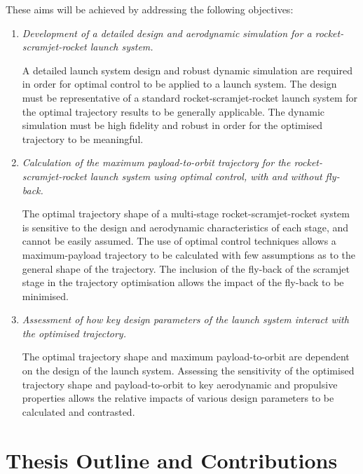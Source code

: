     
\vspace*{10pt}
    \noindent These aims will be achieved by addressing the following objectives:
    \begin{enumerate}
    	 \item \emph{Development of a detailed design and aerodynamic simulation for a rocket-scramjet-rocket launch system.}
    	 
    	   A detailed launch system design and robust dynamic simulation are required in order for optimal control to be applied to a launch system. The design must be representative of a standard rocket-scramjet-rocket launch system for the optimal trajectory results to be generally applicable. The dynamic simulation must be high fidelity and robust in order for the optimised trajectory to be meaningful. \\

\item \emph{Calculation of the maximum payload-to-orbit trajectory for the rocket-scramjet-rocket launch system using optimal control, with and without fly-back.}

The optimal trajectory shape of a multi-stage rocket-scramjet-rocket system is sensitive to the design and aerodynamic characteristics of each stage, and cannot be easily assumed. The use of optimal control techniques allows a maximum-payload trajectory to be calculated with few assumptions as to the general shape of the trajectory. The inclusion of the fly-back of the scramjet stage in the trajectory optimisation allows the impact of the fly-back to be minimised.\\

      \item \emph{Assessment of how key design parameters of the launch system interact with the optimised trajectory.} 

	The optimal trajectory shape and maximum payload-to-orbit are dependent on the design of the launch system. 
	Assessing the sensitivity of the optimised trajectory shape and payload-to-orbit to key aerodynamic and propulsive properties allows the relative impacts of various design parameters to be calculated and contrasted. \\

    

    \end{enumerate}

  \clearpage
  \section{Thesis Outline and Contributions}

